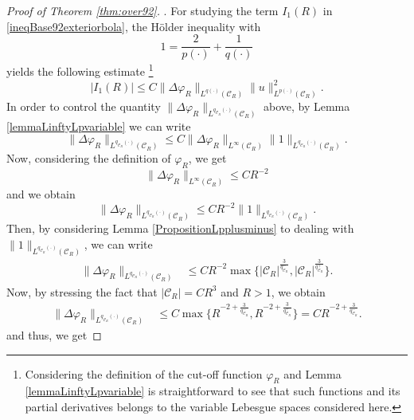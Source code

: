 \documentclass[a4paper,12pt]{amsart}
\theoremstyle{definition}
\theoremstyle{plain}
\renewcommand{\phi}{\varphi}
\let\phi\varphi
\def\vu{ u }
\begin{document}
\begin{proof}[Proof of Theorem \ref{thm:over92}]
. For studying the term $I_1(R)$ in \eqref{ineqBase92exteriorbola}, the H\"older inequality with 
\begin{equation}\label{variable_exponents_1_92_exterior_bola}
1=\frac{2}{p(\cdot)}+\frac{1}{q(\cdot)}
\end{equation} yields the following estimate
\footnote{Considering the definition of the cut-off function  $\phi_R$   and Lemma  \ref{lemmaLinftyLpvariable} is straightforward to see that such functions and its partial derivatives belongs to the variable Lebesgue spaces considered here.} 
\begin{equation}\label{18aveq32_T1_92_exterior_bola}
|I_1(R)|\leq 
C\|\Delta \phi_R \|_{L^{q(\cdot)}(  \mathcal{C}_R )}\|\vu\|_{L^{p(\cdot)}(  \mathcal{C}_R )}^2.
\end{equation}
 In order to control the quantity $\|\Delta \phi_R \|_{L^{q_{ \mathcal{C}_R }(\cdot)}( \mathcal{C}_R )}$ above,
  by  Lemma \ref{lemmaLinftyLpvariable} we can write
\begin{equation}\label{EstimationNormeLinfiniTheta_R1_92_exterior_bola}
\|\Delta \phi_R \|_{L^{q_{ \mathcal{C}_R }(\cdot)}( \mathcal{C}_R )}\leq C\|\Delta \phi_R  \|_{L^{\infty}  ( \mathcal{C}_R )}\|1\|_{L^{q_{ \mathcal{C}_R }(\cdot)}( \mathcal{C}_R )}.
\end{equation}
Now, considering  the definition of  $\phi_R$,  we get 
$$
\|\Delta \phi_R  \|_{L^{\infty}
(  \mathcal{C}_R  )
}\leq CR^{-2}$$
 and we obtain
$$\|\Delta \phi_R \|_{L^{q_{
 \mathcal{C}_R  }
(\cdot)}( \mathcal{C}_R  )}\leq C R^{-2}\|1\|_{L^{q_{ \mathcal{C}_R  }(\cdot)}( \mathcal{C}_R  )}.$$
Then, by considering Lemma \ref{PropositionLpplusminus} to dealing with $\|1\|_{L^{q_{ \mathcal{C}_R }(\cdot)}( \mathcal{C}_R )}$, we can write
\begin{align}\label{EstimationC01_92_exterior_bola}
\|\Delta \phi_R \|_{L^{q_{ \mathcal{C}_R }(\cdot)}( \mathcal{C}_R )}&\leq
 C R^{-2}\max \{| \mathcal{C}_R |^{\frac 3 {q_{ \mathcal{C}_R }^- }}, | \mathcal{C}_R |^{\frac 3 {q_{ \mathcal{C}_R }^+}}\}
 .
\end{align}
Now, by stressing the fact   that 
$|
 \mathcal{C}_R 
|=CR^3$ and $R>1$, we obtain
\begin{align}\label{EstimationC1_92_exterior_bola}
\|\Delta \phi_R \|_{L^{q_{ \mathcal{C}_R }(\cdot)}( \mathcal{C}_R )}&\leq
 C\max \{R^{-2+\frac 3{q_{ \mathcal{C}_R }^-}}, R^{-2+\frac 3 {q_{ \mathcal{C}_R }^+}}\}
=
  C R^{-2+\frac 3{q_{ \mathcal{C}_R }^-}} 
  .
\end{align}
and thus, we get  

\end{proof}
\end{document}
